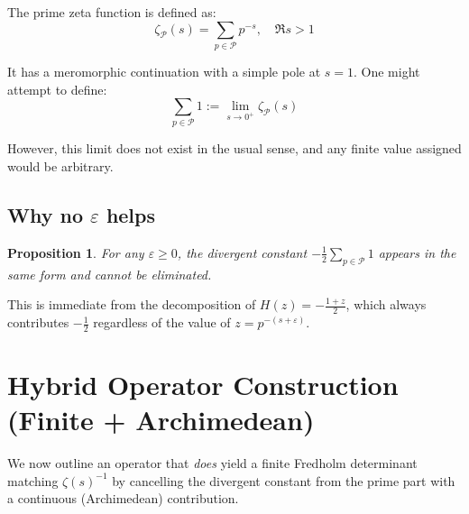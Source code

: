 \documentclass[11pt,a4paper]{article}
\newtheorem{proposition}[theorem]{Proposition}
\theoremstyle{definition}
\theoremstyle{remark}
\newcommand{\calP}{\mathcal{P}}
\begin{document}
The prime zeta function is defined as:
\[
\zeta_{\calP}(s) = \sum_{p \in \calP} p^{-s}, \quad \Re s > 1
\]

It has a meromorphic continuation with a simple pole at $s = 1$. One might attempt to define:
\[
\sum_{p \in \calP} 1 := \lim_{s \to 0^+} \zeta_{\calP}(s)
\]

However, this limit does not exist in the usual sense, and any finite value assigned 
would be arbitrary.

\subsection{Why no $\varepsilon$ helps}

\begin{proposition}
For any $\varepsilon \geq 0$, the divergent constant $-\frac{1}{2}\sum_{p \in \calP} 1$ 
appears in the same form and cannot be eliminated.
\end{proposition}

This is immediate from the decomposition of $H(z) = -\frac{1+z}{2}$, which always 
contributes $-\frac{1}{2}$ regardless of the value of $z = p^{-(s+\varepsilon)}$.

\section{Hybrid Operator Construction (Finite + Archimedean)}\label{sec:hybrid}

We now outline an operator that \emph{does} yield a finite Fredholm determinant
matching $\zeta(s)^{-1}$ by cancelling the divergent constant from the prime part
with a continuous (Archimedean) contribution.
\end{document}
